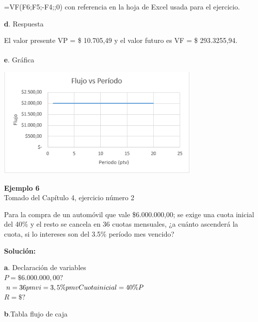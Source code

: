 =VF(F6;F5;-F4;;0) con referencia en la hoja de Excel usada para el ejercicio.

\vspace{2mm}

\textbf{d}. Respuesta

\vspace{2mm}

El valor presente VP = \$ 10.705,49 y el valor futuro es VF = \$ 293.3255,94.
\\\\
\textbf{e}. Gráfica
\begin{center}
	\includegraphics[height=5.4cm]{img/ch8/8_9.png}
\end{center}

\textbf{Ejemplo 6}\\

Tomado del Capítulo 4, ejercicio número 2

\vspace{2mm}

Para la compra de un automóvil que vale \$6.000.000,00; se exige una cuota inicial del 40\% y el resto se cancela en 36 cuotas mensuales, ¿a cuánto ascenderá la cuota, si lo intereses son del 3.5\% período mes vencido?

\vspace{2mm}

\textbf{Solución:}
\vspace{2mm}

\textbf{a}. Declaración de variables\\

	    $P=\$6.000.000,00?$
	    \\
	    $	n=36 pmv 
	    \\
		i=3,5\% pmv
		\\
		Cuota inicial = 40\%P $\\
		$R=\$?$\\
		
\clearpage

\textbf{b}.Tabla flujo de caja
\\

